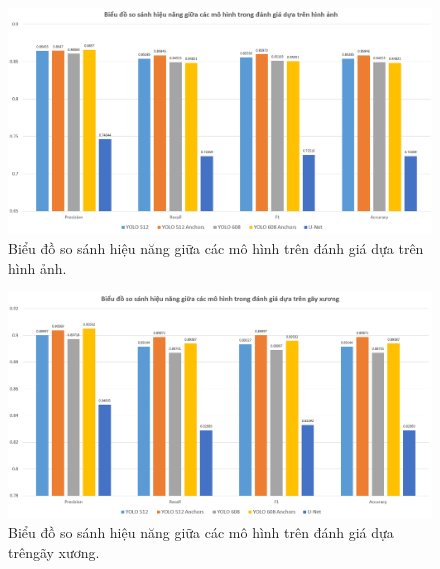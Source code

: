 \documentclass[../the.tex]{subfiles}
\begin{document}
\begin{figure}[ht!]
\centering
	\includegraphics[width=1\textwidth]{images/chart_2.PNG}
	\caption{Biểu đồ so sánh hiệu năng giữa các mô hình trên đánh giá dựa trên hình ảnh.}
	\label{fig:chart_2}
\end{figure}

\begin{figure}[ht!]
\centering
	\includegraphics[width=1\textwidth]{images/chart_3.PNG}
	\caption{Biểu đồ so sánh hiệu năng giữa các mô hình trên đánh giá dựa trêngãy xương.}
	\label{fig:chart_3}
\end{figure}

\end{document}
